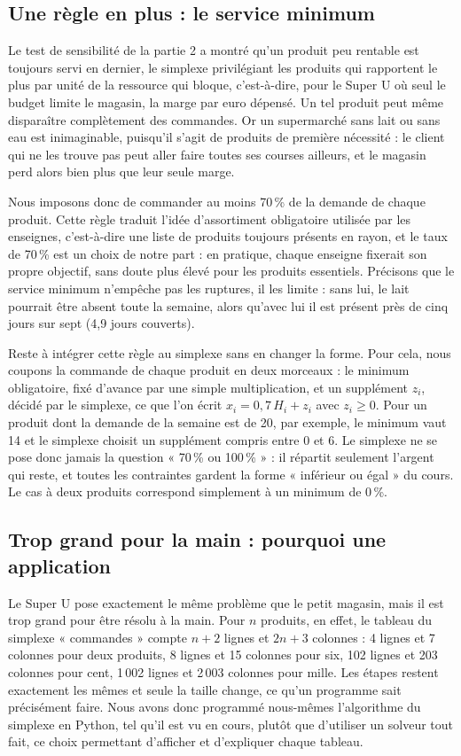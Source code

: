 \documentclass[11pt,a4paper]{article}
\begin{document}
\subsection{Une règle en plus : le service minimum}
Le test de sensibilité de la partie 2 a montré qu'un produit peu rentable est toujours servi
en dernier, le simplexe privilégiant les produits qui rapportent le plus par unité de la
ressource qui bloque, c'est-à-dire, pour le Super U où seul le budget limite le magasin, la
marge par euro dépensé. Un tel produit peut même disparaître complètement des commandes. Or un
supermarché sans lait ou sans eau est inimaginable, puisqu'il s'agit de produits de première
nécessité : le client qui ne les trouve pas peut aller faire toutes ses courses ailleurs, et
le magasin perd alors bien plus que leur seule marge.

Nous imposons donc de commander au moins 70\,\% de la demande de chaque produit. Cette règle
traduit l'idée d'assortiment obligatoire utilisée par les enseignes, c'est-à-dire une liste de
produits toujours présents en rayon, et le taux de 70\,\% est un choix de notre part : en
pratique, chaque enseigne fixerait son propre objectif, sans doute plus élevé pour les produits
essentiels. Précisons que le service minimum n'empêche pas les ruptures, il les limite : sans
lui, le lait pourrait être absent toute la semaine, alors qu'avec lui il est présent près de
cinq jours sur sept (4,9 jours couverts).

Reste à intégrer cette règle au simplexe sans en changer la forme. Pour cela, nous coupons la
commande de chaque produit en deux morceaux : le minimum obligatoire, fixé d'avance par une
simple multiplication, et un supplément $z_i$, décidé par le simplexe, ce que l'on écrit
$x_i = 0{,}7\,H_i + z_i$ avec $z_i \ge 0$. Pour un produit dont la demande de la semaine est
de 20, par exemple, le minimum vaut 14 et le simplexe choisit un supplément compris entre 0 et
6. Le simplexe ne se pose donc jamais la question « 70\,\% ou 100\,\% » : il répartit
seulement l'argent qui reste, et toutes les contraintes gardent la forme « inférieur ou égal »
du cours. Le cas à deux produits correspond simplement à un minimum de 0\,\%.

\subsection{Trop grand pour la main : pourquoi une application}
Le Super U pose exactement le même problème que le petit magasin, mais il est trop grand pour
être résolu à la main. Pour $n$ produits, en effet, le tableau du simplexe « commandes » compte
$n + 2$ lignes et $2n + 3$ colonnes : 4 lignes et 7 colonnes pour deux produits, 8 lignes et
15 colonnes pour six, 102 lignes et 203 colonnes pour cent, 1\,002 lignes et 2\,003 colonnes
pour mille. Les étapes restent exactement les mêmes et seule la taille change, ce qu'un
programme sait précisément faire. Nous avons donc programmé nous-mêmes l'algorithme du
simplexe en Python, tel qu'il est vu en cours, plutôt que d'utiliser un solveur tout fait,
ce choix permettant d'afficher et d'expliquer chaque tableau.
\end{document}
